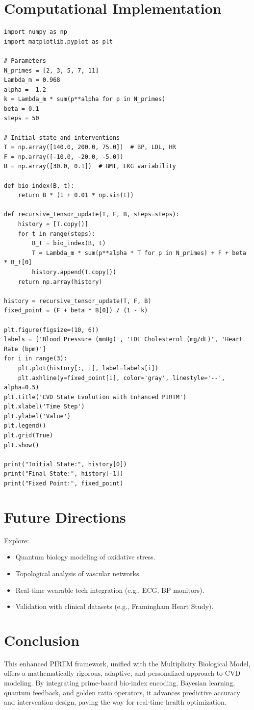 \documentclass{article}
\theoremstyle{plain}
\theoremstyle{claimstyle}
\begin{document}
\section{Computational Implementation}
\begin{verbatim}
import numpy as np
import matplotlib.pyplot as plt

# Parameters
N_primes = [2, 3, 5, 7, 11]
Lambda_m = 0.968
alpha = -1.2
k = Lambda_m * sum(p**alpha for p in N_primes)
beta = 0.1
steps = 50

# Initial state and interventions
T = np.array([140.0, 200.0, 75.0])  # BP, LDL, HR
F = np.array([-10.0, -20.0, -5.0])
B = np.array([30.0, 0.1])  # BMI, EKG variability

def bio_index(B, t):
    return B * (1 + 0.01 * np.sin(t))

def recursive_tensor_update(T, F, B, steps=steps):
    history = [T.copy()]
    for t in range(steps):
        B_t = bio_index(B, t)
        T = Lambda_m * sum(p**alpha * T for p in N_primes) + F + beta * B_t[0]
        history.append(T.copy())
    return np.array(history)

history = recursive_tensor_update(T, F, B)
fixed_point = (F + beta * B[0]) / (1 - k)

plt.figure(figsize=(10, 6))
labels = ['Blood Pressure (mmHg)', 'LDL Cholesterol (mg/dL)', 'Heart Rate (bpm)']
for i in range(3):
    plt.plot(history[:, i], label=labels[i])
    plt.axhline(y=fixed_point[i], color='gray', linestyle='--', alpha=0.5)
plt.title('CVD State Evolution with Enhanced PIRTM')
plt.xlabel('Time Step')
plt.ylabel('Value')
plt.legend()
plt.grid(True)
plt.show()

print("Initial State:", history[0])
print("Final State:", history[-1])
print("Fixed Point:", fixed_point)
\end{verbatim}

\section{Future Directions}
Explore:
\begin{itemize}
    \item Quantum biology modeling of oxidative stress.
    \item Topological analysis of vascular networks.
    \item Real-time wearable tech integration (e.g., ECG, BP monitors).
    \item Validation with clinical datasets (e.g., Framingham Heart Study).
\end{itemize}

\section{Conclusion}
This enhanced PIRTM framework, unified with the Multiplicity Biological Model, offers a mathematically rigorous, adaptive, and personalized approach to CVD modeling. By integrating prime-based bio-index encoding, Bayesian learning, quantum feedback, and golden ratio operators, it advances predictive accuracy and intervention design, paving the way for real-time health optimization.
\nocite{*}


\end{document}
